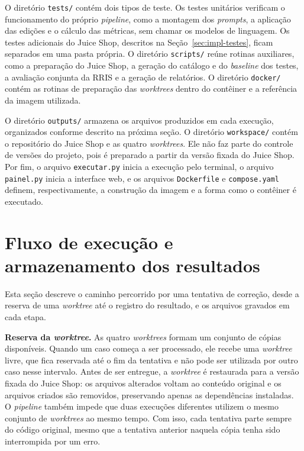 O diretório \texttt{tests/} contém dois tipos de teste. Os testes unitários verificam o funcionamento do próprio \textit{pipeline}, como a montagem dos \textit{prompts}, a aplicação das edições e o cálculo das métricas, sem chamar os modelos de linguagem. Os testes adicionais do Juice Shop, descritos na Seção~\ref{sec:impl-testes}, ficam separados em uma pasta própria. O diretório \texttt{scripts/} reúne rotinas auxiliares, como a preparação do Juice Shop, a geração do catálogo e do \textit{baseline} dos testes, a avaliação conjunta da RRIS e a geração de relatórios. O diretório \texttt{docker/} contém as rotinas de preparação das \textit{worktrees} dentro do contêiner e a referência da imagem utilizada.

O diretório \texttt{outputs/} armazena os arquivos produzidos em cada execução, organizados conforme descrito na próxima seção. O diretório \texttt{workspace/} contém o repositório do Juice Shop e as quatro \textit{worktrees}. Ele não faz parte do controle de versões do projeto, pois é preparado a partir da versão fixada do Juice Shop. Por fim, o arquivo \texttt{executar.py} inicia a execução pelo terminal, o arquivo \texttt{painel.py} inicia a interface web, e os arquivos \texttt{Dockerfile} e \texttt{compose.yaml} definem, respectivamente, a construção da imagem e a forma como o contêiner é executado.

\section{Fluxo de execução e armazenamento dos resultados}
\label{sec:impl-fluxo}

Esta seção descreve o caminho percorrido por uma tentativa de correção, desde a reserva de uma \textit{worktree} até o registro do resultado, e os arquivos gravados em cada etapa.

\textbf{Reserva da \textit{worktree}.} As quatro \textit{worktrees} formam um conjunto de cópias disponíveis. Quando um caso começa a ser processado, ele recebe uma \textit{worktree} livre, que fica reservada até o fim da tentativa e não pode ser utilizada por outro caso nesse intervalo. Antes de ser entregue, a \textit{worktree} é restaurada para a versão fixada do Juice Shop: os arquivos alterados voltam ao conteúdo original e os arquivos criados são removidos, preservando apenas as dependências instaladas. O \textit{pipeline} também impede que duas execuções diferentes utilizem o mesmo conjunto de \textit{worktrees} ao mesmo tempo. Com isso, cada tentativa parte sempre do código original, mesmo que a tentativa anterior naquela cópia tenha sido interrompida por um erro.

